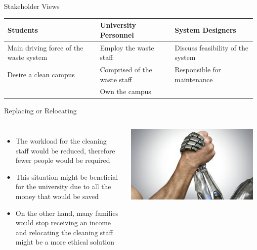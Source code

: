 \documentclass[18pt]{beamer}
\begin{document}
    \begin{frame}{Stakeholder Views}
        \begin{center}
        \begin{tabular}{|p{} | p{} | p{}|}
            \hline
        	Students & University Personnel & System Designers \\
            \hline
        	Main driving force of the waste system & Employ the waste staff & Discuss feasibility of the system \\
            \hline
            Desire a clean campus & Comprised of the waste staff & Responsible for maintenance \\
            \hline
            & Own the campus & \\
            \hline
        \end{tabular}
        \end{center}
    \end{frame}


    \begin{frame}{Replacing or Relocating}
        \begin{columns}
            \begin{itemize}
                \item The workload for the cleaning staff would be reduced, therefore fewer people would be required
                \item This situation might be beneficial for the university due to all the money that would be saved
                \item On the other hand, many families would stop receiving an income and relocating the cleaning staff might be a more ethical solution
            \end{itemize}
            \includegraphics[width=0.99\columnwidth]{humanvsrobot}
        \end{columns}
    \end{frame}
\end{document}
